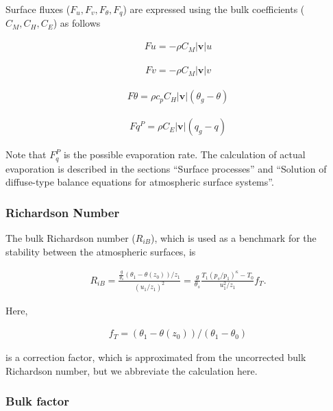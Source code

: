 Surface fluxes (\(F_u, F_v, F_\theta, F_q\)) are expressed using the
bulk coefficients (\(C_M, C_H, C_E\)) as follows

\begin{eqnarray}
Fu  =  - \rho C_M |{\mathbf{v}}| u
\end{eqnarray}

\begin{eqnarray}
Fv  =  - \rho C_M |{\mathbf{v}}| v
\end{eqnarray}

\begin{eqnarray}
F\theta  = \rho c_p C_H |{\mathbf{v}}| ( \theta_g - \theta )
\end{eqnarray}

\begin{eqnarray}
Fq^P =  \rho C_E |{\mathbf{v}}| ( q_g - q )
\end{eqnarray}

Note that \(F_q^P\) is the possible evaporation rate. The calculation of
actual evaporation is described in the sections ``Surface processes''
and ``Solution of diffuse-type balance equations for atmospheric surface
systems''.

\hypertarget{richardson-number}{%
\subsubsection{Richardson Number}\label{richardson-number}}

The bulk Richardson number (\(R_{iB}\)), which is used as a benchmark
for the stability between the atmospheric surfaces, is

\begin{eqnarray}
R_{iB} = \frac{ \frac{g}{\theta_s} (\theta_1 - \theta(z_0))/z_1 }
              { (u_1/z_1)^2                                  }
       = \frac{g}{\theta_s}
         \frac{T_1 (p_s/p_1)^\kappa - T_0 }{u_1^2/z_1} f_T .
\end{eqnarray}

Here,

\begin{eqnarray}
f_T = (\theta_1 - \theta(z_0))/(\theta_1 - \theta_0)
\end{eqnarray}

is a correction factor, which is approximated from the uncorrected bulk
Richardson number, but we abbreviate the calculation here.

\hypertarget{bulk-factor}{%
\subsubsection{Bulk factor}\label{bulk-factor}}

